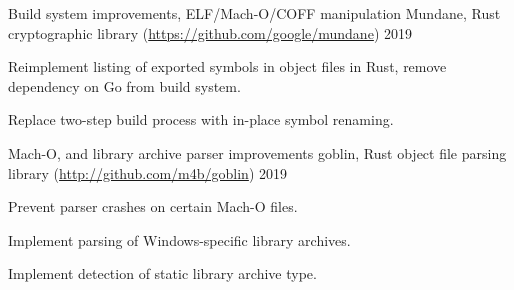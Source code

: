 

\begin{cventries}

  \cventry
    {Build system improvements, ELF/Mach-O/COFF manipulation} %
    {Mundane, Rust cryptographic library (\url{https://github.com/google/mundane})} %
    {} %
    {2019} %
    {
      \begin{cvitems} %
        \item {Reimplement listing of exported symbols in object files in Rust, remove dependency on Go from build system.}
        \item {Replace two-step build process with in-place symbol renaming.}
      \end{cvitems}
    }

  \cventry
    {Mach-O, and library archive parser improvements} %
    {goblin, Rust object file parsing library (\url{http://github.com/m4b/goblin})} %
    {} %
    {2019} %
    {
      \begin{cvitems} %
        \item {Prevent parser crashes on certain Mach-O files.}
        \item {Implement parsing of Windows-specific library archives.}
        \item {Implement detection of static library archive type.}
      \end{cvitems}
    }

\end{cventries}
